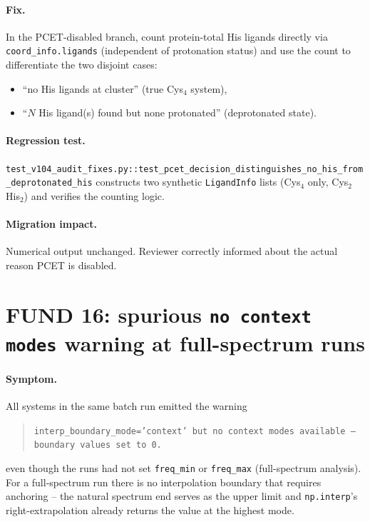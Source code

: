 \documentclass[10pt,a4paper,twoside]{article}
\newcommand{\fn}[1]{\texttt{#1}}
\newcommand{\cfgkey}[1]{\texttt{#1}}
\begin{document}
\paragraph{Fix.}
In the PCET-disabled branch, count protein-total His ligands
directly via \texttt{coord\_info.ligands} (independent of
protonation status) and use the count to differentiate the two
disjoint cases:
\begin{itemize}
  \item ``no His ligands at cluster'' (true Cys$_4$ system),
  \item ``$N$ His ligand(s) found but none protonated''
        (deprotonated state).
\end{itemize}

\paragraph{Regression test.}
\fn{test\_v104\_audit\_fixes.py::test\_pcet\_decision\_distinguishes\_no\_his\_from\_deprotonated\_his}
constructs two synthetic \fn{LigandInfo} lists (Cys$_4$ only,
Cys$_2$His$_2$) and verifies the counting logic.

\paragraph{Migration impact.}
Numerical output unchanged. Reviewer correctly informed about
the actual reason PCET is disabled.

\section{FUND 16: spurious \texttt{no context modes} warning at full-spectrum runs}
\label{sec:fund-16}

\paragraph{Symptom.}
All systems in the same batch run emitted the warning
\begin{quote}
\texttt{interp\_boundary\_mode='context' but no context modes
available -- boundary values set to 0.}
\end{quote}
even though the runs had not set \cfgkey{freq\_min} or
\cfgkey{freq\_max} (full-spectrum analysis). For a full-spectrum
run there is no interpolation boundary that requires anchoring --
the natural spectrum end serves as the upper limit and
\fn{np.interp}'s right-extrapolation already returns the value
at the highest mode.
\end{document}
